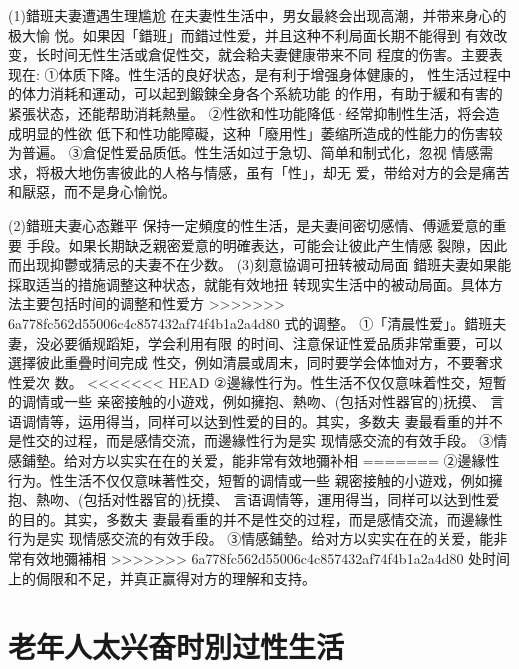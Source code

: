 \documentclass[12pt,UTF8]{ctexbook}
\begin{document}
(1)錯班夫妻遭遇生理尴尬
在夫妻性生活中，男女最終会出现高潮，并带来身心的极大愉
悦。如果因「錯班」而錯过性爱，并且这种不利局面长期不能得到
有效改变，长时间无性生活或倉促性交，就会耠夫妻健康带来不同
程度的伤害。主要表现在:
①体质下降。性生活的良好状态，是有利于增强身体健康的，
性生活过程中的体力消耗和運动，可以起到鍛鍊全身各个系統功能
的作用，有助于緩和有害的紧張状态，还能帮助消耗熱量。
②性欲和性功能降低·经常抑制性生活，将会造成明显的性欲
低下和性功能障礙，这种「廢用性」萎缩所造成的性能力的伤害较
为普遍。
③倉促性爱品质低。性生活如过于急切、简单和制式化，忽视
情感需求，将极大地伤害彼此的人格与情感，虽有「性」，却无
爱，带给对方的会是痛苦和厭惡，而不是身心愉悦。

(2)錯班夫妻心态難平
保持一定頻度的性生活，是夫妻间密切感情、傅遞爱意的重要
手段。如果长期缺乏親密爱意的明確表达，可能会让彼此产生情感
裂隙，因此而出现抑鬱或猜忌的夫妻不在少数。
(3)刻意協调可扭转被动局面
錯班夫妻如果能採取适当的措施调整这种状态，就能有效地扭
转现实生活中的被动局面。具体方法主要包括时间的调整和性爱方
>>>>>>> 6a778fc562d55006c4c857432af74f4b1a2a4d80
式的调整。
①「清晨性爱」。錯班夫妻，没必要循规蹈矩，学会利用有限
的时间、注意保证性爱品质非常重要，可以選擇彼此重疊时间完成
性交，例如清晨或周末，同时要学会体恤对方，不要奢求性爱次
数。
<<<<<<< HEAD
②邊緣性行为。性生活不仅仅意味着性交，短暫的调情或一些
亲密接触的小遊戏，例如擁抱、熱吻、(包括对性器官的)抚摸、
言语调情等，运用得当，同样可以达到性爱的目的。其实，多数夫
妻最看重的并不是性交的过程，而是感情交流，而邊緣性行为是实
现情感交流的有效手段。
③情感鋪墊。给对方以实实在在的关爱，能非常有效地彌补相
=======
②邊緣性行为。性生活不仅仅意味著性交，短暫的调情或一些
親密接触的小遊戏，例如擁抱、熱吻、(包括对性器官的)抚摸、
言语调情等，運用得当，同样可以达到性爱的目的。其实，多数夫
妻最看重的并不是性交的过程，而是感情交流，而邊緣性行为是实
现情感交流的有效手段。
③情感鋪墊。给对方以实实在在的关爱，能非常有效地彌補相
>>>>>>> 6a778fc562d55006c4c857432af74f4b1a2a4d80
处时间上的侷限和不足，并真正赢得对方的理解和支持。


\section{老年人太兴奋时別过性生活}
\end{document}
